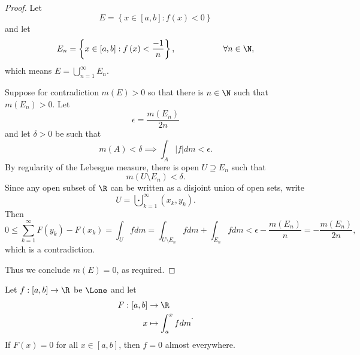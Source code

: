 \documentclass[pmath451]{subfiles}
\begin{document}
    \begin{proof}
        Let
        \begin{equation*}
            E=\left\lbrace x\in\left[ a,b \right]:f\left( x \right)<0 \right\rbrace
        \end{equation*}
        and let
        \begin{equation*}
            E_n = \left\lbrace x\in\left[ a,b \right]:f\left( x \right)<\frac{-1}{n} \right\rbrace , \hspace{2cm}\forall n\in\N,
        \end{equation*}
        which means $E = \bigcup^{\infty}_{n=1} E_n$.

        Suppose for contradiction $m\left( E \right)>0$ so that there is $n\in\N$ such that $m\left( E_n \right)>0$. Let
        \begin{equation*}
            \epsilon = \frac{m\left( E_n \right)}{2n}
        \end{equation*}
        and let $\delta>0$ be such that
        \begin{equation*}
            m\left( A \right) < \delta \implies \int_A\left| f \right|dm < \epsilon.
        \end{equation*}
        By regularity of the Lebesgue measure, there is open $U\supseteq E_n$ such that
        \begin{equation*}
            m\left( U\setminus E_n \right) < \delta.
        \end{equation*}
        Since any open subset of $\R$ can be written as a disjoint union of open sets, write
        \begin{equation*}
            U = \bigcupdot^{\infty}_{k=1} \left( x_k,y_k \right).
        \end{equation*}
        Then
        \begin{equation*}
            0\leq \sum^{\infty}_{k=1} F\left( y_k \right) - F\left( x_k \right) = \int_Ufdm = \int_{U\setminus E_n} fdm + \int_{E_n}fdm < \epsilon - \frac{m\left( E_n \right)}{n} = -\frac{m\left( E_n \right)}{2n},
        \end{equation*}
        which is a contradiction.

        Thus we conclude $m\left( E \right) = 0$, as required.
    \end{proof}
    
    \begin{cor}{}
        Let $f:\left[ a,b \right]\to\R$ be $\Lone$ and let
        \begin{equation*}
            \begin{aligned}
                F:\left[ a,b \right]&\to\R\\
                x&\mapsto \int^{x}_{a}fdm
            \end{aligned} .
        \end{equation*}
        If $F\left( x \right) = 0$ for all $x\in \left[ a,b \right]$, then $f=0$ almost everywhere.
    \end{cor}	
\end{document}
